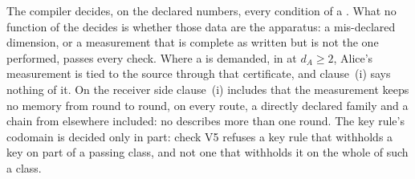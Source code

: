 
The compiler decides, on the declared numbers, every condition of a
. What no function of the
 decides is whether those data are the apparatus: a
mis-declared dimension, or a measurement that is complete as written but is
not the one performed, passes every check. Where a
 is demanded, in
 at $d_A\ge2$, Alice's measurement is tied to the
source through that certificate, and clause~(i) says nothing of it. On the
receiver side clause~(i) includes that the measurement keeps no memory from
round to round, on every route, a directly declared family and a chain from
elsewhere included: no  describes more than one round. The
key rule's codomain is decided only in part: check V5 refuses a key rule that
withholds a key on part of a passing class, and not one that withholds it on
the whole of such a class.

